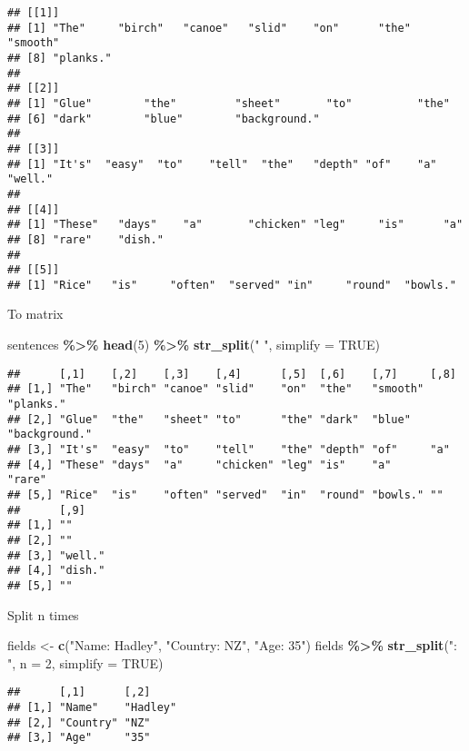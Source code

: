 \documentclass[
]{article}
\newenvironment{Shaded}{\begin{snugshade}}{\end{snugshade}}
\newcommand{\DataTypeTok}[1]{\textcolor[rgb]{0.13,0.29,0.53}{#1}}
\newcommand{\DecValTok}[1]{\textcolor[rgb]{0.00,0.00,0.81}{#1}}
\newcommand{\KeywordTok}[1]{\textcolor[rgb]{0.13,0.29,0.53}{\textbf{#1}}}
\newcommand{\NormalTok}[1]{#1}
\newcommand{\OperatorTok}[1]{\textcolor[rgb]{0.81,0.36,0.00}{\textbf{#1}}}
\newcommand{\OtherTok}[1]{\textcolor[rgb]{0.56,0.35,0.01}{#1}}
\newcommand{\StringTok}[1]{\textcolor[rgb]{0.31,0.60,0.02}{#1}}
\begin{document}
\begin{verbatim}
## [[1]]
## [1] "The"     "birch"   "canoe"   "slid"    "on"      "the"     "smooth" 
## [8] "planks."
## 
## [[2]]
## [1] "Glue"        "the"         "sheet"       "to"          "the"        
## [6] "dark"        "blue"        "background."
## 
## [[3]]
## [1] "It's"  "easy"  "to"    "tell"  "the"   "depth" "of"    "a"     "well."
## 
## [[4]]
## [1] "These"   "days"    "a"       "chicken" "leg"     "is"      "a"      
## [8] "rare"    "dish."  
## 
## [[5]]
## [1] "Rice"   "is"     "often"  "served" "in"     "round"  "bowls."
\end{verbatim}

To matrix

\begin{Shaded}
\begin{Highlighting}[]
\NormalTok{sentences }\OperatorTok{\%\textgreater{}\%}
\KeywordTok{head}\NormalTok{(}\DecValTok{5}\NormalTok{) }\OperatorTok{\%\textgreater{}\%}
\KeywordTok{str\_split}\NormalTok{(}\StringTok{" "}\NormalTok{, }\DataTypeTok{simplify =} \OtherTok{TRUE}\NormalTok{)}
\end{Highlighting}
\end{Shaded}

\begin{verbatim}
##      [,1]    [,2]    [,3]    [,4]      [,5]  [,6]    [,7]     [,8]         
## [1,] "The"   "birch" "canoe" "slid"    "on"  "the"   "smooth" "planks."    
## [2,] "Glue"  "the"   "sheet" "to"      "the" "dark"  "blue"   "background."
## [3,] "It's"  "easy"  "to"    "tell"    "the" "depth" "of"     "a"          
## [4,] "These" "days"  "a"     "chicken" "leg" "is"    "a"      "rare"       
## [5,] "Rice"  "is"    "often" "served"  "in"  "round" "bowls." ""           
##      [,9]   
## [1,] ""     
## [2,] ""     
## [3,] "well."
## [4,] "dish."
## [5,] ""
\end{verbatim}

Split n times

\begin{Shaded}
\begin{Highlighting}[]
\NormalTok{fields \textless{}{-}}\StringTok{ }\KeywordTok{c}\NormalTok{(}\StringTok{"Name: Hadley"}\NormalTok{, }\StringTok{"Country: NZ"}\NormalTok{, }\StringTok{"Age: 35"}\NormalTok{)}
\NormalTok{fields }\OperatorTok{\%\textgreater{}\%}\StringTok{ }\KeywordTok{str\_split}\NormalTok{(}\StringTok{": "}\NormalTok{, }\DataTypeTok{n =} \DecValTok{2}\NormalTok{, }\DataTypeTok{simplify =} \OtherTok{TRUE}\NormalTok{)}
\end{Highlighting}
\end{Shaded}

\begin{verbatim}
##      [,1]      [,2]    
## [1,] "Name"    "Hadley"
## [2,] "Country" "NZ"    
## [3,] "Age"     "35"
\end{verbatim}
\end{document}
